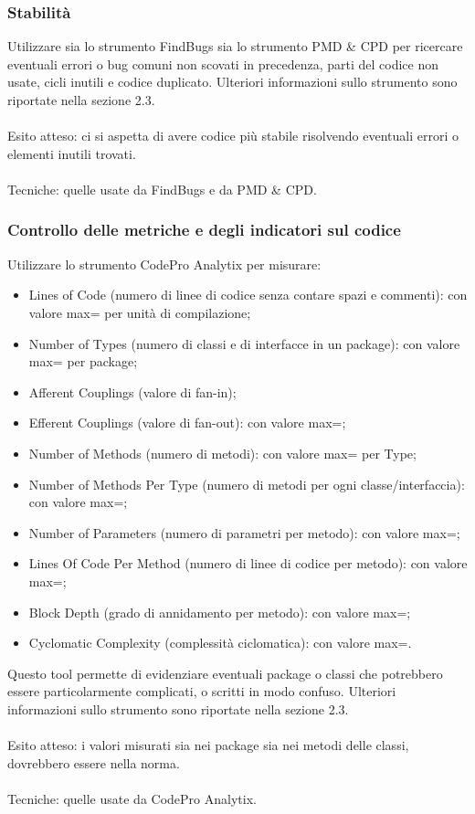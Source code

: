 \subsubsection*{Stabilit\`a}
Utilizzare sia lo strumento FindBugs sia lo strumento PMD \& CPD per ricercare
eventuali errori o bug comuni non scovati in precedenza, parti del codice non
usate, cicli inutili e codice duplicato. Ulteriori informazioni sullo strumento
sono riportate nella sezione 2.3.\\\\ 
Esito atteso: ci si aspetta di avere codice pi\`u stabile risolvendo
eventuali errori o elementi inutili trovati.\\\\ 
Tecniche: quelle usate da FindBugs e da PMD \& CPD.

\subsubsection*{Controllo delle metriche e degli indicatori sul codice}
Utilizzare lo strumento CodePro Analytix per misurare:
\begin{itemize}
  \item Lines of Code (numero di linee di codice senza contare spazi e
  commenti): con valore max= per unit\`a di compilazione;
  \item Number of Types (numero di classi e di interfacce in un package): con
  valore max= per package;
  \item Afferent Couplings (valore di fan-in);
  \item Efferent Couplings (valore di fan-out): con valore max=;
  \item Number of Methods (numero di metodi): con valore max= per Type;
  \item Number of Methods Per Type (numero di metodi per ogni
  classe/interfaccia): con valore max=;
  \item Number of Parameters (numero di parametri per
  metodo): con valore max=;
  \item Lines Of Code Per Method (numero di linee di codice
  per metodo): con valore max=;
  \item Block Depth (grado di annidamento per metodo): con valore max=;
  \item Cyclomatic Complexity (complessit\`a ciclomatica): con valore max=.
\end{itemize}
Questo tool permette di evidenziare eventuali package o classi che
potrebbero essere particolarmente complicati, o scritti in modo confuso.
Ulteriori informazioni sullo strumento sono riportate nella sezione 2.3.\\\\ 
Esito atteso: i valori misurati sia nei package sia nei metodi delle
classi, dovrebbero essere nella norma.\\\\ 
Tecniche: quelle usate da CodePro Analytix.


